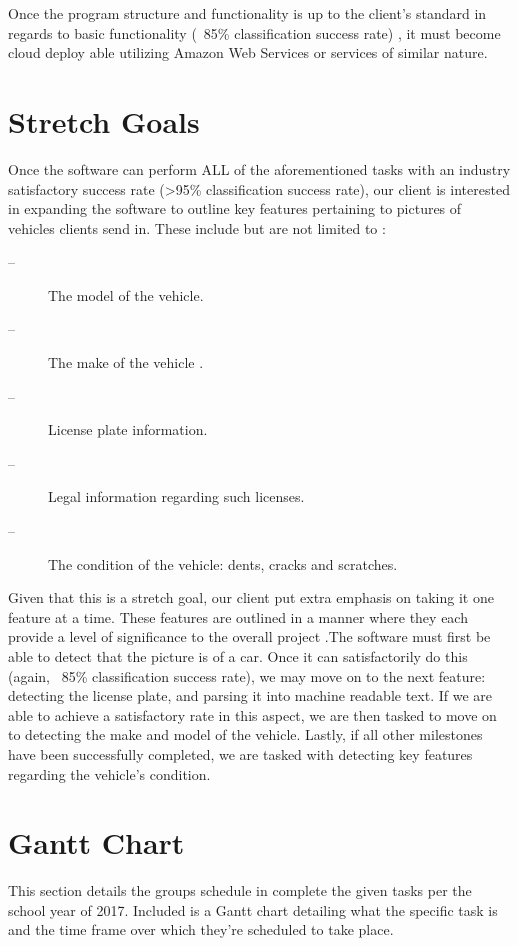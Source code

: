 \documentclass[onecolumn, draftclsnofoot,10pt, compsoc]{IEEEtran}
\begin{document}
Once the program structure and functionality is up to the client's standard in regards to basic functionality (~85\% classification success rate) , it must become cloud deploy able utilizing Amazon Web Services or services of similar nature. 

\section{Stretch Goals}
	
	Once the software can perform ALL of the aforementioned tasks with an industry satisfactory success rate (>95\% classification success rate), our client is interested in expanding the software to outline key features pertaining to pictures of vehicles clients send in. These include but are not limited to :
\begin{description}
	\item[--]The model of the vehicle.
	\item[--]The make of the vehicle .
	\item[--]License plate information.
	\item[--]Legal information regarding such licenses.
	\item[--]The condition of the vehicle: dents, cracks and scratches.
\end{description}

Given that this is a stretch goal, our client put extra emphasis on taking it one feature at a time. These features are outlined in a manner where they each provide a level of significance to the overall project .The software must first be able to detect that the picture is of a car.  Once it can satisfactorily do this (again, ~85\% classification success rate), we may move on to the next feature: detecting the license plate, and parsing it into machine readable text. If we are able to achieve a satisfactory rate in this aspect, we are then tasked to move on to detecting the make and model of the vehicle. Lastly, if all other milestones have been successfully completed, we are tasked with detecting key features regarding the vehicle's condition. 

\section{Gantt Chart}

This section details the groups schedule in complete the given tasks per the school year of 2017. Included is a Gantt chart detailing what the specific task is and the time frame over which they're scheduled to take place.
\end{document}
